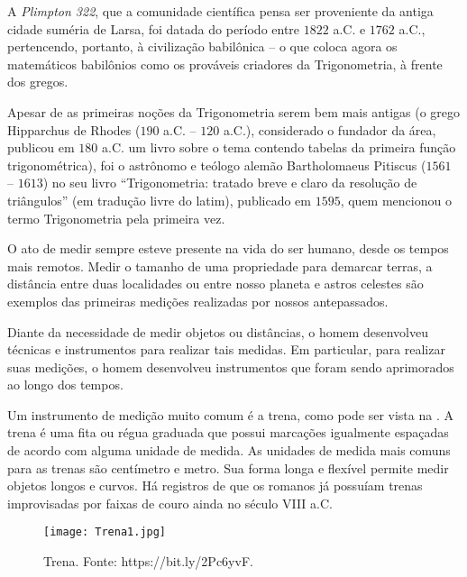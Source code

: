 A {\textit {Plimpton 322}}, que a comunidade científica pensa ser proveniente da antiga cidade suméria de Larsa, foi datada do período entre $1822$ a.C. e $1762$ a.C., pertencendo, portanto, à civilização babilônica – o que coloca agora os matemáticos babilônios como os prováveis criadores da Trigonometria, à frente dos gregos.

  
 Apesar de as primeiras noções da Trigonometria serem  bem mais antigas (o grego Hipparchus de Rhodes ($190$ a.C. – $120$ a.C.), considerado o fundador da área, publicou em $180$ a.C. um livro sobre o tema contendo tabelas da primeira função trigonométrica), foi o astrônomo e teólogo alemão Bartholomaeus Pitiscus ($1561$ – $1613$) no seu livro ``Trigonometria: tratado breve e claro da resolução de triângulos'' (em tradução livre do latim), publicado em $1595$, quem mencionou o termo Trigonometria pela primeira vez.  


O ato de medir sempre esteve presente na vida do ser humano, desde os tempos mais remotos. Medir o tamanho de uma propriedade para demarcar terras, a distância entre duas localidades ou entre nosso planeta e astros celestes são exemplos das primeiras medições realizadas por nossos antepassados.

Diante da necessidade de medir objetos ou distâncias, o homem desenvolveu técnicas e instrumentos para realizar tais medidas. Em particular, para realizar suas medições, o homem desenvolveu instrumentos  que foram sendo aprimorados ao longo dos tempos.

Um instrumento de medição muito comum é a trena, como pode ser vista na . A trena é uma fita ou régua graduada que possui marcações igualmente espaçadas de acordo com alguma unidade de medida. As unidades de medida mais comuns para as trenas são centímetro e metro. Sua forma longa e flexível permite medir objetos longos e curvos. Há registros de que os romanos já possuíam trenas improvisadas por faixas de couro ainda no século VIII a.C.

\begin{figure}[H]
    \centering
    \texttt{[image: Trena1.jpg]}
    \caption{Trena. Fonte: https://bit.ly/2Pc6yvF.}
    \label{Trena1}
\end{figure}

